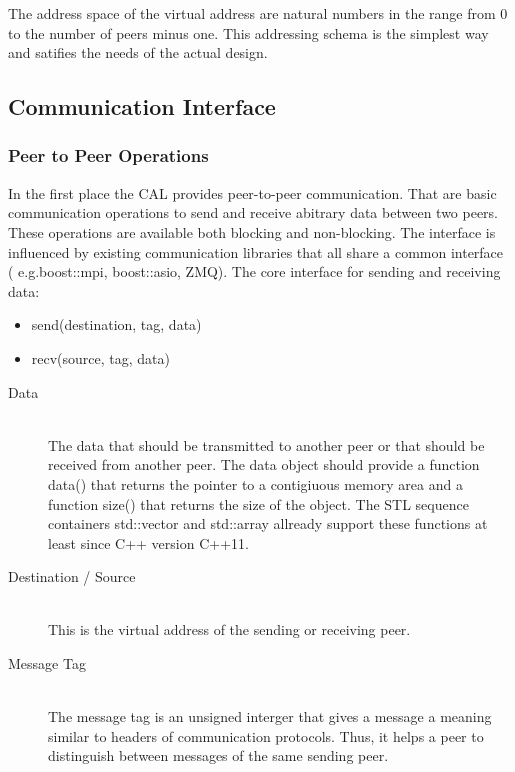 The address space of the virtual address are natural numbers in 
the range from 0 to the number of peers minus one. This addressing
schema is the simplest way and satifies the needs of the actual design.

\subsection{Communication Interface}

\subsubsection{Peer to Peer Operations}
In the first place the CAL provides peer-to-peer communication. That
are basic communication operations to send and receive abitrary data
between two peers. These operations are available both blocking and
non-blocking. The interface is influenced by existing communication
libraries that all share a common interface ( e.g.boost::mpi,
boost::asio, ZMQ). The core interface for sending and receiving data:

\begin{itemize}
  \item send(destination, tag, data)
  \item recv(source, tag, data)
\end{itemize}

\begin{description}
\item[Data] \hfill \\
  The data that should be transmitted to
  another peer or that should be received from another peer.  The data
  object should provide a function data() that returns the pointer to a
  contigiuous memory area and a function size() that returns the size
  of the object. The STL sequence containers std::vector and
  std::array allready support these functions at least since C++ version
  C++11.
\item[Destination / Source] \hfill \\
  This is the virtual address of the sending or receiving peer.
\item[Message Tag] \hfill \\
  The message tag is an unsigned interger that gives
  a message a meaning similar to headers of communication
  protocols. Thus, it helps a peer to distinguish between messages of
  the same sending peer.
\end{description}

